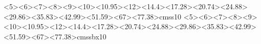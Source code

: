 \documentclass[12pt,a4paper,oneside,naustrian]{amsbook}
\numberwithin{section}{chapter}
\numberwithin{equation}{section}
\numberwithin{figure}{section}
\theoremstyle{plain}
\theoremstyle{plain}
\begin{document}
\leftmargin 0cm
\textwidth 16.7cm
\textheight 23cm
\topmargin -2.7cm
\oddsidemargin 0.1cm
\parindent 0pt

\def\title{4D Druck im Unterricht:\\ Fraktale}
\def\name{A.~B.~Conrad Dachsteiner}
\def\institute{Institut für \\Didaktik der Mathematik}
\def\supervisor{Dr.~Zoltán Kovács}
\def\assist{Dr.~Zsolt Lavicza}
\def\date{Juni 2025}

\thispagestyle{empty}
\def\ifundefined#1{\expandafter\ifx\csname#1\endcsname\relax}
  {<5><6><7><8><9><10><10.95><12><14.4><17.28><20.74><24.88><29.86><35.83><42.99><51.59><67><77.38>cmss10}{}
  {<5><6><7><8><9><10><10.95><12><14.4><17.28><20.74><24.88><29.86><35.83><42.99><51.59><67><77.38>cmssbx10}{}
\makeatletter
\def\Huge{\@setfontsize\Huge{29.86pt}{36}}
\makeatother
\unitlength 1cm
\sffamily
\end{document}
